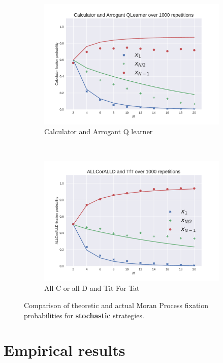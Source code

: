 \documentclass[10pt,journal]{IEEEtran}
\begin{document}
\begin{figure}[!hbtp]
    \begin{subfigure}[t]{.5\columnwidth}
        \centering
        \includegraphics[width=.95\columnwidth]{img/Calculator_v_Arrogant_QLearner.pdf}
        \caption{Calculator and Arrogant Q learner}
    \end{subfigure}%
    ~
    \begin{subfigure}[t]{.5\columnwidth}
        \centering
        \includegraphics[width=.95\columnwidth]{img/ALLCorALLD_v_TfT.pdf}
        \caption{All C or all D and Tit For Tat}
    \end{subfigure}%
    \caption{Comparison of theoretic and actual Moran Process
             fixation probabilities for \textbf{stochastic} strategies.}
    \label{fig:comparison_stochastic}
\end{figure}

\section{Empirical results}\label{sec:empirical_results}
\end{document}
